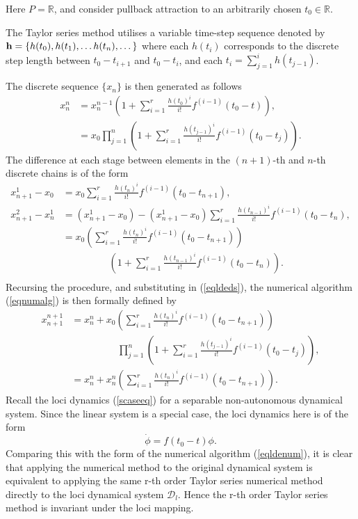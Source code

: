 \begin{prf}
Here $P = \mathbb{R}$, and consider pullback attraction to an arbitrarily chosen
$t_0 \in \mathbb{R}$.

The Taylor series method utilises a variable time-step sequence denoted by
${\bf h} = \{ h(t_0), h(t_1), \dots h(t_n), \dots \}$ where each $h(t_i)$
corresponds to the discrete step length between $t_0 - t_{i+1}$ and $t_0 - t_i$,
and each $t_i = \sum_{j=1}^i h(t_{j-1})$.

The discrete sequence $\{x_n\}$ is then generated as follows
\begin{align}
x^n_n &= x^{n-1}_n \left( 1 + \sum_{i=1}^r \frac{h(t_0)^i}{i!} f^{(i-1)} (
            t_0 - t) \right),  \nonumber   \\
&= x_0 \prod_{j=1}^n \left( 1 + \sum_{i=1}^r
            \frac{h(t_{j-1})^i}{i!} f^{(i-1)} ( t_0 - t_{j}) \right).
            \label{eqldeds}
\end{align}
The difference at each stage between elements in the $(n+1)$-th and $n$-th
discrete chains is of the form
\begin{align*}
x^1_{n+1} - x_0 &= x_0 \sum_{i=1}^r \frac{h(t_n)^i}{i!} f^{(i-1)} ( t_0 - t_{n +
             1}), \\
x^2_{n+1} - x^1_n &= (x^1_{n+1} - x_0) - (x^1_{n+1} - x_0) \sum_{i=1}^r
            \frac{h(t_{n-1})^i}{i!} f^{(i-1)} ( t_0 - t_{n}), \\
&= x_0 \left( \sum_{i=1}^r \frac{h(t_n)^i}{i!} f^{(i-1)} ( t_0 - t_{n +
             1}) \right) \\
&\hspace{2cm}  \left( 1 + \sum_{i=1}^r
            \frac{h(t_{n-1})^i}{i!} f^{(i-1)} ( t_0 - t_{n}) \right). \\
\end{align*}
Recursing the procedure, and substituting in (\ref{eqldeds}), the numerical
algorithm (\ref{eqnumalg}) is then formally defined by
\begin{align}
x^{n+1}_{n+1} &= x^n_n + x_0 \left( \sum_{i=1}^r \frac{h(t_n)^i}{i!}
               f^{(i-1)} ( t_0 - t_{n +1}) \right) \nonumber \\
&\hspace{2cm} \prod_{j=1}^n \left( 1 + \sum_{i=1}^r
            \frac{h(t_{j-1})^i}{i!} f^{(i-1)} ( t_0 - t_{j}) \right), \nonumber
           \\
&= x^n_n + x^n_n \left( \sum_{i=1}^r \frac{h(t_n)^i}{i!}
               f^{(i-1)} ( t_0 - t_{n +1}) \right). \label{eqldenum}
\end{align}
Recall the loci dynamics (\ref{scaseeq}) for a separable non-autonomous
dynamical system. Since the linear system is a special case, the loci dynamics
here is of the form
\[ \dot{\phi} = f(t_0 - t) \phi. \]
Comparing this with the form of the numerical algorithm (\ref{eqldenum}), it is
clear that applying the numerical method to the original dynamical system is
equivalent to applying the same r-th order Taylor series numerical method
directly to the loci dynamical system $\mathcal{D}_l$. Hence
the r-th order Taylor series method is invariant under the loci mapping.
\end{prf}

